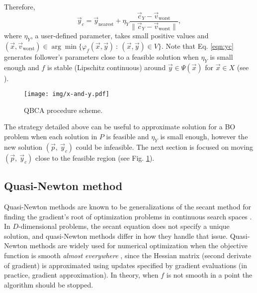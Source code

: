 \documentclass[conference]{IEEEtran}
\theoremstyle{definition}
\begin{document}
Therefore,
\begin{equation}
    \vec{y}_c = \vec{y}_{\text{nearest}} + \eta_{Y} \dfrac{\vec{c}_Y - \vec{v}_{\text{worst}}}{\| \vec{c}_Y - \vec{v}_{\text{worst}} \|},
    \label{eqn:yc}
\end{equation} %
% 
where $\eta_Y$, a user-defined parameter, takes small positive values and 
% 
$
    (\vec{x}, \vec{v}_{\text{worst}}) \in \arg \min \{\varphi_f(\vec{x}, \vec{y} )  \ : \ (\vec{x}, \vec{y}) \in V \}
$. Note that Eq. \ref{eqn:yc} generates follower's parameters close to a feasible
solution when $\eta_{Y}$ is small enough and $f$ is stable (Lipschitz continuous)
around $\vec{y} \in \Psi(\vec{x}) $ for  $\vec{x} \in X$ (see \cite{dempe2002foundations}). %
% 

% 
\begin{figure}[!ht]
    \centering
    \texttt{[image: img/x-and-y.pdf]}
    \caption{QBCA procedure scheme.}
    \label{fig:qca}
\end{figure}
% 
The strategy detailed above can be useful to approximate solution for a BO problem
when each solution in  $P$ is feasible and $\eta_{Y}$ is small enough, however
the new solution $(\vec{p},\ \vec{y}_c)$ could be infeasible. The next section
is focused on moving $(\vec{p},\ \vec{y}_c)$ close to the feasible region
(see Fig. \ref{fig:qca}).


\subsection{Quasi-Newton method} %
\label{sub:nonsmooth_optimization_via_bfgs}

Quasi-Newton methods are known to be generalizations of the secant method for
finding the gradient's root of optimization problems in continuous search spaces \cite{fletcher2013practical,liu1989limited}.
In $D$-dimensional problems, the secant equation does not specify a unique solution,
and quasi-Newton methods differ in how they handle that issue. Quasi-Newton methods
are widely used for numerical optimization when the objective function is smooth
\textit{almost everywhere} \cite{lewis2013nonsmooth}, since the Hessian matrix
(second derivate of gradient) is approximated using updates specified by gradient
evaluations (in practice, gradient approximation). In theory, when $f$ is not
smooth in a point the algorithm should be stopped. 
\end{document}
